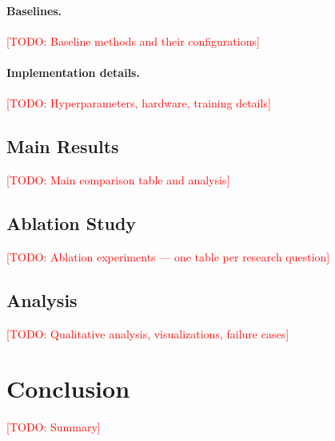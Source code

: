 \documentclass{article}
\newcommand{\ours}{\textsc{<MethodName>}}
\newcommand{\todo}[1]{\textcolor{red}{[TODO: #1]}}
\begin{document}
\paragraph{Baselines.}
\todo{Baseline methods and their configurations}

\paragraph{Implementation details.}
\todo{Hyperparameters, hardware, training details}

\subsection{Main Results}
\label{sec:main_results}

\todo{Main comparison table and analysis}


\subsection{Ablation Study}
\label{sec:ablation}
\todo{Ablation experiments — one table per research question}

\subsection{Analysis}
\label{sec:analysis}
\todo{Qualitative analysis, visualizations, failure cases}

\section{Conclusion}
\label{sec:conclusion}

\todo{Summary}
\end{document}
